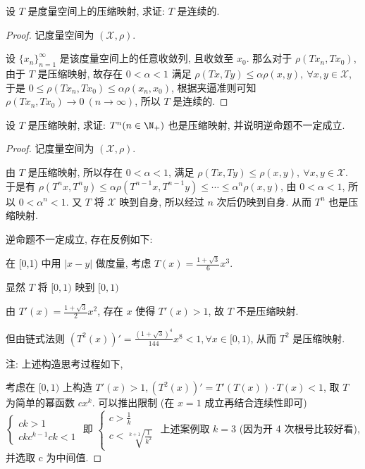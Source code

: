 \problem[1.1.4] 设 $T$ 是度量空间上的压缩映射, 求证: $T$ 是连续的.

\begin{proof}
	记度量空间为 $(\mathscr X,\rho)$.

	设 $\{x_n\}_{n=1}^\infty$ 是该度量空间上的任意收敛列, 且收敛至 $x_0$. 那么对于 $\rho(Tx_n,Tx_0)$, 由于 $T$ 是压缩映射, 故存在 $0<\alpha<1$ 满足 $\rho(Tx,Ty)\leqslant\alpha\rho(x,y),\ \forall x,y\in\mathscr X$, 于是 $0\leqslant\rho(Tx_n,Tx_0)\leqslant\alpha\rho(x_n,x_0)$, 根据夹逼准则可知 $\rho(Tx_n,Tx_0)\to 0\ (n\to \infty)$, 所以 $T$ 是连续的.
\end{proof}

\problem[1.1.5] 设 $T$ 是压缩映射, 求证: $T^n(n\in\N_+)$ 也是压缩映射, 并说明逆命题不一定成立.

\begin{proof}
	记度量空间为 $(\mathscr X,\rho)$.

	由 $T$ 是压缩映射, 所以存在 $0<\alpha<1$, 满足 $\rho(Tx,Ty)\leqslant\rho(x,y),\ \forall x,y\in \mathscr X$. 于是有 $\rho(T^nx,T^ny)\leqslant\alpha\rho(T^{n-1}x,T^{n-1}y)\leqslant\cdots\leqslant\alpha^n\rho(x,y)$, 由 $0<\alpha<1$, 所以 $0<\alpha^n<1$. 又 $T$ 将 $\mathscr X$ 映到自身, 所以经过 $n$ 次后仍映到自身. 从而 $T^n$ 也是压缩映射.

	逆命题不一定成立, 存在反例如下:

	在 [0,1) 中用 $|x-y|$ 做度量, 考虑 $T(x)=\frac{1+\sqrt{3}}{6}x^3$.

	显然 $T$ 将 $[0,1)$ 映到 $[0,1)$

	由 $T'(x)=\frac{1+\sqrt{3}}{2}x^2$, 存在 $x$ 使得 $T'(x)>1$, 故 $T$ 不是压缩映射.

	但由链式法则 $(T^2(x))'=\frac{(1+\sqrt 3)^4}{144}x^8<1,\forall x\in [0,1)$, 从而 $T^2$ 是压缩映射.

	注: 上述构造思考过程如下,

	考虑在 $[0,1)$ 上构造 $T'(x)>1,(T^2(x))'=T'(T(x))\cdot T(x)<1$, 取 $T$ 为简单的幂函数 $cx^k$. 可以推出限制 (在 $x=1$ 成立再结合连续性即可) $\left\lbrace\begin{array}{c}
		ck>1 \\
		ckc^{k-1} ck<1
	\end{array}\right.$ 即 $\left\lbrace\begin{array}{c}
	c>\frac 1 k \\
	c<\sqrt[k+1]{\frac{1}{k^2}}
	\end{array}\right.$ 上述案例取 $k=3$ (因为开 4 次根号比较好看), 并选取 c 为中间值.
\end{proof}


